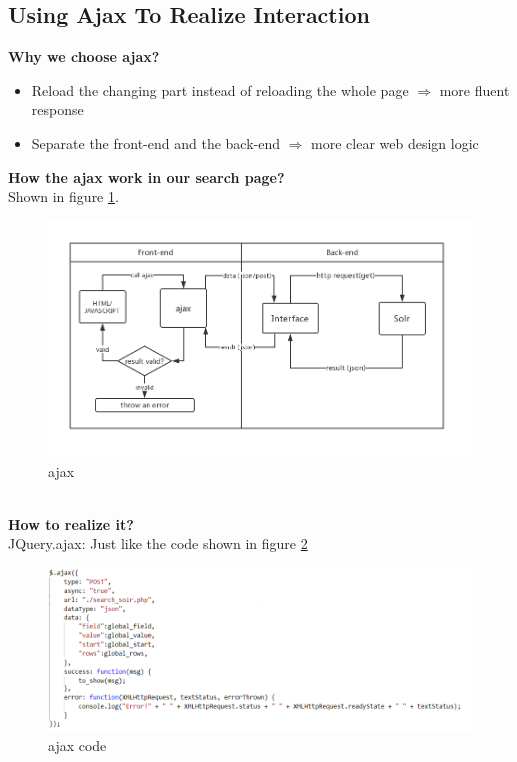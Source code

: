 \documentclass{article}
\begin{document}
	\subsection{Using Ajax To Realize Interaction}
	\textbf{Why we choose ajax?}\\
	\begin{itemize}
		\item Reload the changing part instead of reloading the whole page $\Rightarrow$  more fluent response
		\item Separate the front-end and the back-end $\Rightarrow$ more clear web design logic
	\end{itemize}
	\textbf{How the ajax work in our search page?}\\
	Shown in figure \ref{ajaxgraph}.
	\begin{figure}[htb]
		\includegraphics[width=1.0\textwidth]{ajax_graph.png}
		\caption{ajax}
		\label{ajaxgraph}
	\end{figure}\\
	\textbf{How to realize it?}\\
	JQuery.ajax: Just like the code shown in figure \ref{ajaxfigure}\\
	\begin{figure}[htb]
		\includegraphics[width=1.0\textwidth]{ajaxfigure.png}
		\caption{ajax code}
		\label{ajaxfigure}
	\end{figure}\\
\end{document}

